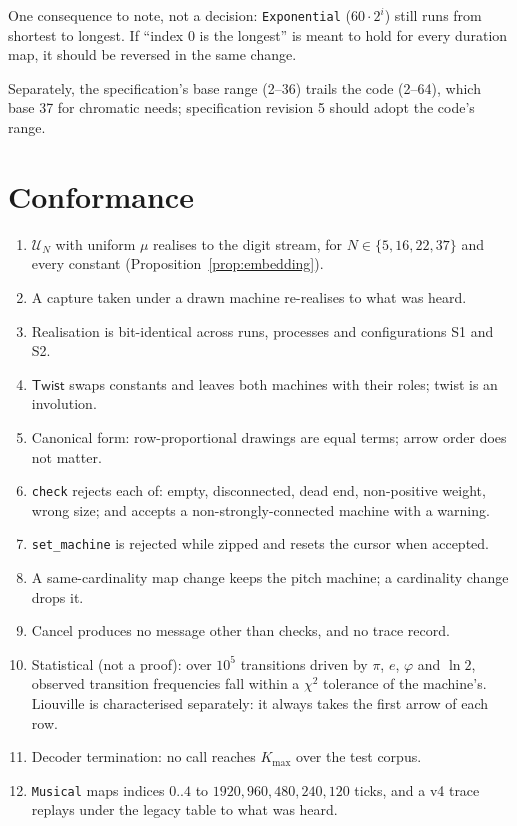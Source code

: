 \documentclass[11pt,a4paper]{article}
\theoremstyle{definition}
\theoremstyle{plain}
\theoremstyle{remark}
\begin{document}
\begin{enumerate}[leftmargin=*,itemsep=3pt]
  One consequence to note, not a decision: \texttt{Exponential} ($60\cdot2^i$) still runs from
  shortest to longest. If ``index 0 is the longest'' is meant to hold for every duration map, it
  should be reversed in the same change.

  Separately, the specification's base range (2--36) trails the code (2--64), which base 37 for
  chromatic needs; specification revision 5 should adopt the code's range.
\end{enumerate}

\section{Conformance}

\begin{enumerate}[leftmargin=*,itemsep=2pt]
\item $\mathcal{U}_N$ with uniform $\mu$ realises to the digit stream, for $N\in\{5,16,22,37\}$ and
  every constant (Proposition~\ref{prop:embedding}).
\item A capture taken under a drawn machine re-realises to what was heard.
\item Realisation is bit-identical across runs, processes and configurations S1 and S2.
\item $\mathsf{Twist}$ swaps constants and leaves both machines with their roles; twist is an
  involution.
\item Canonical form: row-proportional drawings are equal terms; arrow order does not matter.
\item \texttt{check} rejects each of: empty, disconnected, dead end, non-positive weight, wrong size;
  and accepts a non-strongly-connected machine with a warning.
\item \texttt{set\_machine} is rejected while zipped and resets the cursor when accepted.
\item A same-cardinality map change keeps the pitch machine; a cardinality change drops it.
\item Cancel produces no message other than checks, and no trace record.
\item Statistical (not a proof): over $10^5$ transitions driven by $\pi$, $e$, $\varphi$ and
  $\ln2$, observed transition frequencies fall within a $\chi^2$ tolerance of the machine's.
  Liouville is characterised separately: it always takes the first arrow of each row.
\item Decoder termination: no call reaches $K_{\max}$ over the test corpus.
\item \texttt{Musical} maps indices $0..4$ to $1920,960,480,240,120$ ticks, and a v4 trace replays
  under the legacy table to what was heard.
\end{enumerate}
\end{document}
